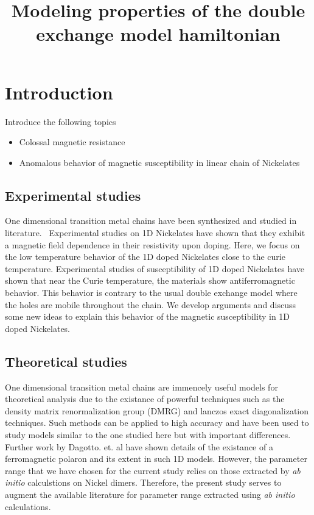 \documentclass[ openright,titlepage,numbers=noenddot,headinclude,twoside,%
                footinclude=true,cleardoublepage=empty,abstractoff,%
                BCOR=5mm,paper=a4,fontsize=11pt,%
                ngerman,american,%
]{scrreprt}
\title{Modeling properties of the double exchange model hamiltonian}
\begin{document}
\maketitle
\thispagestyle{fancy}
\chapter{Introduction}

Introduce the following topics
\begin{itemize}
  \item Colossal magnetic resistance
  \item Anomalous behavior of magnetic susceptibility in linear chain of Nickelates
\end{itemize}

\section{Experimental studies}

One dimensional transition metal chains have been synthesized and studied in
literature.~\cite{darriet_compound_1993,batlogg_haldane_1994} Experimental
studies on 1D Nickelates have shown that they exhibit a magnetic field
dependence in their resistivity upon doping.\cite{xu_holes_2000} Here, we focus
on the low temperature behavior of the 1D doped Nickelates close to the curie
temperature. Experimental studies of susceptibility of 1D doped Nickelates have
shown that near the Curie temperature, the materials show antiferromagnetic
behavior.\cite{Ramirez} This behavior is contrary to the usual double exchange
model where the holes are mobile throughout the chain. We develop arguments and
discuss some new ideas to explain this behavior of the magnetic susceptibility
in 1D doped Nickelates.

\section{Theoretical studies}

One dimensional transition metal chains are immencely useful models
for theoretical analysis due to the existance of powerful techniques
such as the density matrix renormalization group (DMRG) and lanczos
exact diagonalization techniques. Such methods can be applied to
high accuracy and have been used to study models similar to the
one studied here but with important differences.\cite{dagotto_correlated_1994,patel_emergence_2020}
Further work by Dagotto. et. al have shown details of the existance
of a ferromagnetic polaron and its extent in such 1D models.\cite{malvezzi_origin_2001} However, the parameter range
that we have chosen for the current study relies on those extracted
by \textit{ab initio} calculstions on Nickel dimers.\cite{bastardis_microscopic_2007,bastardis_isotropic_2008}
Therefore, the present study serves to augment the available literature
for parameter range extracted using \textit{ab initio} calculations.
\end{document}
